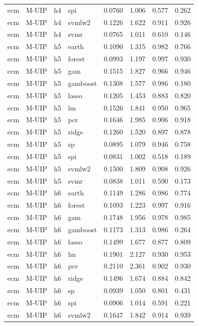 \begin{ThreePartTable}
\begin{longtable}[t]{llclcccc}
ecm & M-UIP & h4 & spi & 0.0760 & 1.006 & 0.577 & 0.262\\
ecm & M-UIP & h4 & svmlw2 & 0.1226 & 1.622 & 0.911 & 0.926\\
ecm & M-UIP & h4 & svmr & 0.0765 & 1.011 & 0.610 & 0.146\\
\addlinespace
ecm & M-UIP & h5 & earth & 0.1090 & 1.315 & 0.982 & 0.766\\
ecm & M-UIP & h5 & forest & 0.0993 & 1.197 & 0.997 & 0.930\\
ecm & M-UIP & h5 & gam & 0.1515 & 1.827 & 0.966 & 0.946\\
ecm & M-UIP & h5 & gamboost & 0.1308 & 1.577 & 0.986 & 0.180\\
ecm & M-UIP & h5 & lasso & 0.1205 & 1.453 & 0.883 & 0.820\\
ecm & M-UIP & h5 & lm & 0.1526 & 1.841 & 0.950 & 0.965\\
ecm & M-UIP & h5 & pcr & 0.1646 & 1.985 & 0.906 & 0.918\\
ecm & M-UIP & h5 & ridge & 0.1260 & 1.520 & 0.897 & 0.878\\
ecm & M-UIP & h5 & sp & 0.0895 & 1.079 & 0.946 & 0.758\\
ecm & M-UIP & h5 & spi & 0.0831 & 1.002 & 0.518 & 0.189\\
ecm & M-UIP & h5 & svmlw2 & 0.1500 & 1.809 & 0.908 & 0.926\\
ecm & M-UIP & h5 & svmr & 0.0838 & 1.011 & 0.590 & 0.173\\
\addlinespace
ecm & M-UIP & h6 & earth & 0.1149 & 1.286 & 0.986 & 0.774\\
ecm & M-UIP & h6 & forest & 0.1093 & 1.223 & 0.997 & 0.916\\
ecm & M-UIP & h6 & gam & 0.1748 & 1.956 & 0.978 & 0.985\\
ecm & M-UIP & h6 & gamboost & 0.1173 & 1.313 & 0.986 & 0.264\\
ecm & M-UIP & h6 & lasso & 0.1499 & 1.677 & 0.877 & 0.809\\
ecm & M-UIP & h6 & lm & 0.1901 & 2.127 & 0.930 & 0.953\\
ecm & M-UIP & h6 & pcr & 0.2110 & 2.361 & 0.902 & 0.930\\
ecm & M-UIP & h6 & ridge & 0.1496 & 1.674 & 0.884 & 0.842\\
ecm & M-UIP & h6 & sp & 0.0939 & 1.050 & 0.801 & 0.431\\
ecm & M-UIP & h6 & spi & 0.0906 & 1.014 & 0.591 & 0.221\\
ecm & M-UIP & h6 & svmlw2 & 0.1647 & 1.842 & 0.914 & 0.939\\

\end{longtable}
\end{ThreePartTable}

